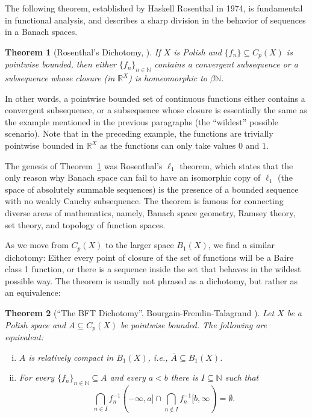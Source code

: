 \documentclass[psamsfonts]{amsart}
\newtheorem{thm}{Theorem}[section]
\theoremstyle{definition}
\theoremstyle{remark}
\numberwithin{equation}{section}
\begin{document}
The following theorem,  established by Haskell Rosenthal in 1974,  is fundamental  in functional analysis, and describes a sharp division in the behavior of sequences in a Banach spaces.

\begin{thm}[Rosenthal's Dichotomy, \cite{Rosenthal:1974}]
\label{T:Rosenthal}
    If $X$ is Polish and $\{f_n\}\subseteq C_p(X)$ is pointwise bounded, then either $\{f_n\}_{n\in\mathbb{N}}$ contains a convergent subsequence or a subsequence whose closure (in $\mathbb{R}^X$) is homeomorphic to $\beta\mathbb{N}$.
\end{thm}

In other words, a pointwise bounded set of continuous functions  either contains a convergent subsequence, or a subsequence whose closure is essentially the same as the example mentioned in the previous paragraphs (the ``wildest'' possible scenario).
Note that in the preceding example, the functions are trivially pointwise bounded in $\mathbb{R}^X$ as the functions can only take values $0$ and $1$.


The genesis of Theorem~\ref{T:Rosenthal} was Rosenthal's $\ell_1$ theorem, which states that the only reason why Banach space can fail to have an isomorphic copy of  $\ell_1$  (the space of absolutely summable sequences) is the presence of a bounded sequence  with no weakly Cauchy subsequence.
The theorem is famous for connecting diverse areas of mathematics, namely,  Banach space geometry, Ramsey theory, set theory, and topology of function spaces.

As we move from $C_p(X)$ to the larger space $B_1(X)$, we find a similar dichotomy: Either every point of closure of the set of functions will be a Baire class 1 function, or there is a sequence inside the set that behaves in the wildest possible way.
The theorem is usually not phrased as a dichotomy, but rather as an equivalence:

\begin{thm}[``The BFT Dichotomy''.
Bourgain-Fremlin-Talagrand {\cite[Theorem 4G]{BFT_1978_PCompactBaire}}]
\label{BFT}
    Let $X$ be a Polish space and $A\subseteq C_p(X)$ be pointwise bounded.
The following are equivalent:
    \begin{enumerate}[(i)]
        \item $A$ is relatively compact in $B_1(X)$, i.e., $\overline{A}\subseteq B_1(X)$.
        \item For every $\{f_n\}_{n\in\mathbb{N}}\subseteq A$ and every $a<b$ there is $I\subseteq\mathbb{N}$ such that
$$\bigcap_{n\in I}f_n^{-1}(-\infty,a]\cap\bigcap_{n\notin I}f_n^{-1}[b,\infty)=\emptyset.$$
    \end{enumerate}
\end{thm}
\end{document}
